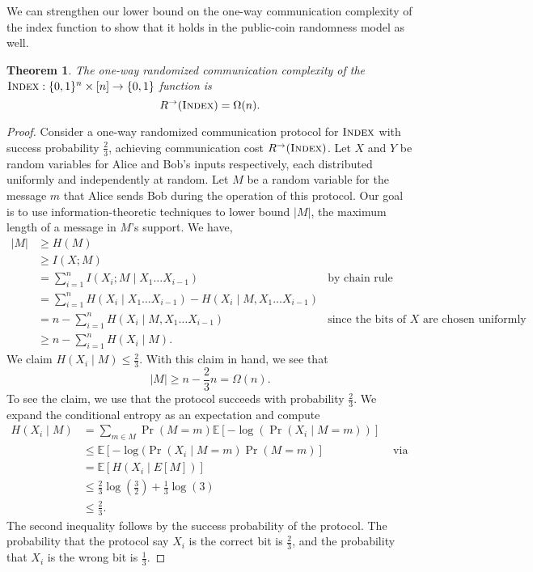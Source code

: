 \documentclass[11pt]{amsart}
\theoremstyle{plain}
\newtheorem{theorem}{Theorem}
\theoremstyle{definition}
\theoremstyle{plain}
\newcommand{\Index}{\textsc{Index}}
\begin{document}
We can strengthen our lower bound on the one-way communication complexity of the index function to show that it holds in the public-coin randomness model as well.

\begin{theorem}
The one-way randomized communication complexity of the $\Index : \{0,1\}^n \times [n] \to \{0,1\}$ function is
\[
R^\rightarrow(\Index) = \Omega(n).
\]
\end{theorem}

\begin{proof}
Consider a one-way randomized communication protocol for $\Index$ with success probability $\frac{2}{3}$, achieving communication cost $R^\rightarrow(\Index)$. Let $X$ and $Y$ be random variables for Alice and Bob's inputs respectively, each distributed uniformly and independently at random. Let $M$ be a random variable for the message $m$ that Alice sends Bob during the operation of this protocol. Our goal is to use information-theoretic techniques to lower bound $|M|$, the maximum length of a message in $M$'s support. We have,
\begin{align*}
|M| &\geq H(M)\\
&\geq I(X;M) \\
&=\sum_{i=1}^n I(X_i; M \mid X_1\dots X_{i-1}) &\text{by chain rule} \\
&=\sum_{i=1}^n H(X_i\mid X_1\dots X_{i-1}) - H(X_i\mid M, X_1\dots X_{i-1})\\
&= n - \sum_{i=1}^n H(X_i\mid M, X_1\dots X_{i-1}) &\text{since the bits of $X$ are chosen uniformly independently} \\
&\geq n-\sum_{i=1}^n H(X_i\mid M).
\end{align*} 
We claim $H(X_i\mid M)\leq \frac{2}{3}$. With this claim in hand, we see that
$$|M| \geq n-\frac{2}{3}n =\Omega(n).$$
To see the claim, we use that the protocol succeeds with probability $\frac{2}{3}$. We expand the conditional entropy as an expectation and compute
\begin{align*}
	H(X_i\mid M) &= \sum_{m \in M} \Pr(M=m)\mathbb{E}[-\log(\Pr(X_i\mid M=m))]\\
	&\leq \mathbb{E}[-\log(\Pr(X_i\mid M=m)\Pr(M=m)] &\text{ via Jensen's inequality}\\
	&= \mathbb{E}[H(X_i\mid E[M])]\\
	&\leq \frac{2}{3}\log\left(\frac{3}{2}\right) + \frac{1}{3}\log(3)\\
	&\leq \frac{2}{3}.
\end{align*}
The second inequality follows by the success probability of the protocol. The probability that the protocol say $X_i$ is the correct bit is $\frac{2}{3}$, and the probability that $X_i$ is the wrong bit is $\frac{1}{3}$.
\end{proof}
\end{document}
